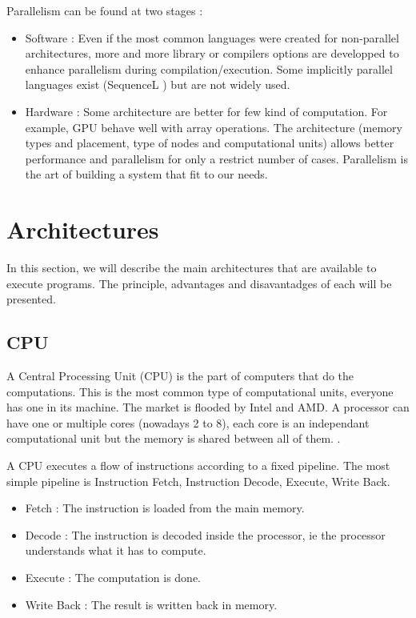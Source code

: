 Parallelism can be found at two stages :
\begin{itemize}
\item Software : Even if the most common languages were created for non-parallel architectures, more and more library or compilers options are developped to enhance parallelism during compilation/execution. Some implicitly parallel languages exist (SequenceL ) but are not widely used.
\item Hardware : Some architecture are better for few kind of computation. For example, GPU behave well with array operations. The architecture (memory types and placement, type of nodes and computational units) allows better performance and parallelism  for only a restrict number of cases. Parallelism is the art of building a system that fit to our needs.
\end{itemize}

\section{Architectures}
In this section, we will describe the main architectures that are available to execute programs. The principle, advantages and disavantadges of each will be presented.

\subsection{CPU}
A Central Processing Unit (CPU) is the part of computers that do the computations. This is the most common type of computational units, everyone has one in its machine. The market is flooded  by Intel and AMD. A processor can have one or multiple cores (nowadays 2 to 8), each core is an independant computational unit but the memory is shared between all of them. 
.

A CPU executes a flow of instructions according to a fixed pipeline. The most simple pipeline is Instruction Fetch, Instruction Decode, Execute, Write Back.
\begin{itemize}
\item Fetch : The instruction is loaded from the main memory.
\item Decode : The instruction is decoded inside the processor, ie the processor understands what it has to compute.
\item Execute : The computation is done.
\item Write Back : The result is written back in memory.
\end{itemize}

